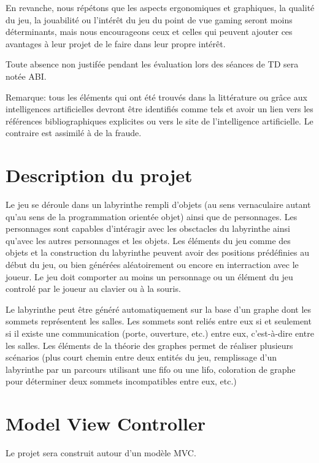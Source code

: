 \documentclass{article}
\begin{document}
En revanche, nous répétons que les aspects ergonomiques et graphiques, la qualité du jeu, la jouabilité ou l’intérêt du jeu du point de vue 
gaming seront moins déterminants, mais nous encourageons ceux et celles qui peuvent ajouter ces avantages à leur projet de 
le faire dans leur propre intérêt.

Toute absence non justifée pendant les évaluation lors des séances de TD sera notée ABI.

Remarque: tous les éléments qui ont été trouvés dans la littérature ou grâce aux intelligences artificielles
devront être identifiés comme tels et avoir un lien vers les références
bibliographiques explicites ou vers le site de l'intelligence artificielle. Le contraire est assimilé à de la fraude.

\section*{Description du projet}

Le jeu se déroule dans un labyrinthe rempli d'objets (au sens vernaculaire autant qu'au sens de la programmation orientée objet) ainsi que de personnages.
Les personnages sont capables d'intéragir avec les obsctacles du labyrinthe ainsi qu'avec les autres personnages et les objets. 
Les éléments du jeu comme des objets et la construction du labyrinthe peuvent avoir des positions prédéfinies au début du jeu, ou bien générées aléatoirement ou encore en interraction avec le joueur.
Le jeu doit comporter au moins un personnage ou un élément du jeu controlé par le joueur au clavier ou à la souris.

Le labyrinthe peut être généré automatiquement sur la base d'un graphe dont les sommets représentent les salles.
Les sommets sont reliés entre eux si et seulement si il existe une communication (porte, ouverture, etc.) entre eux, c'est-à-dire entre les salles.
Les éléments de la théorie des graphes permet de réaliser plusieurs scénarios (plus court chemin entre deux entités du jeu, 
remplissage d'un labyrinthe par un parcours utilisant une fifo ou une lifo, coloration de graphe pour déterminer deux sommets 
incompatibles entre eux, etc.)

\section*{Model View Controller}

Le projet sera construit autour d'un modèle MVC.
\end{document}
